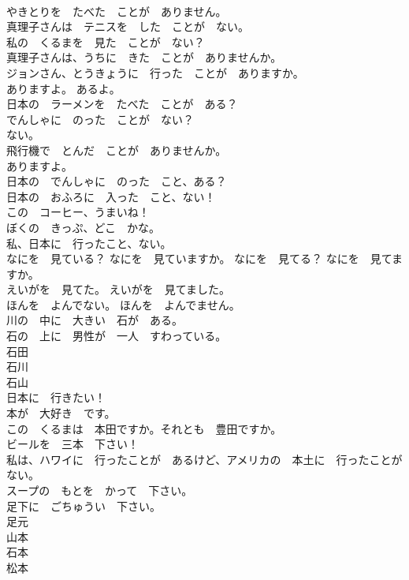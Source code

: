 \documentclass[8pt]{extreport}
\begin{document}
\begin{CJK}{UTF8}{min}
\\	やきとりを　たべた　ことが　ありません。	
\\	真理子さんは　テニスを　した　ことが　ない。	
\\	私の　くるまを　見た　ことが　ない？	
\\	真理子さんは、うちに　きた　ことが　ありませんか。	
\\	ジョンさん、とうきょうに　行った　ことが　ありますか。	
\\	ありますよ。 あるよ。	
\\	日本の　ラーメンを　たべた　ことが　ある？	
\\	でんしゃに　のった　ことが　ない？	
\\	ない。	
\\	飛行機で　とんだ　ことが　ありませんか。	
\\	ありますよ。	
\\	日本の　でんしゃに　のった　こと、ある？	
\\	日本の　おふろに　入った　こと、ない！	
\\	この　コーヒー、うまいね！	
\\	ぼくの　きっぷ、どこ　かな。	
\\	私、日本に　行ったこと、ない。	
\\	なにを　見ている？ なにを　見ていますか。 なにを　見てる？ なにを　見てますか。	
\\	えいがを　見てた。 えいがを　見てました。	
\\	ほんを　よんでない。 ほんを　よんでません。	
\\	川の　中に　大きい　石が　ある。	
\\	石の　上に　男性が　一人　すわっている。	
\\	石田	
\\	石川	
\\	石山	
\\	日本に　行きたい！	
\\	本が　大好き　です。	
\\	この　くるまは　本田ですか。それとも　豊田ですか。	
\\	ビールを　三本　下さい！	
\\	私は、ハワイに　行ったことが　あるけど、アメリカの　本土に　行ったことが　ない。	
\\	スープの　もとを　かって　下さい。	
\\	足下に　ごちゅうい　下さい。	
\\	足元	
\\	山本	
\\	石本	
\\	松本	

\end{CJK}
\end{document}
